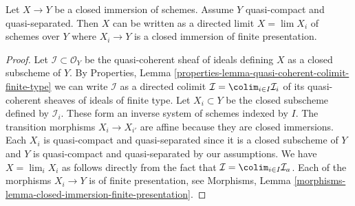\begin{lemma}
\label{lemma-closed-is-limit-closed-and-finite-presentation}
Let $X \to Y$ be a closed immersion of schemes. Assume $Y$ quasi-compact and
quasi-separated. Then $X$ can be written as a directed limit $X = \lim X_i$
of schemes over $Y$ where $X_i \to Y$ is a closed immersion
of finite presentation.
\end{lemma}

\begin{proof}
Let $\mathcal{I} \subset \mathcal{O}_Y$ be the quasi-coherent sheaf of
ideals defining $X$ as a closed subscheme of $Y$. By
Properties, Lemma \ref{properties-lemma-quasi-coherent-colimit-finite-type}
we can write $\mathcal{I}$ as a directed colimit
$\mathcal{I} = \colim_{i \in I} \mathcal{I}_i$ of its
quasi-coherent sheaves of ideals of finite type.
Let $X_i \subset Y$ be the closed subscheme defined by $\mathcal{I}_i$.
These form an inverse system of schemes indexed by $I$.
The transition morphisms $X_i \to X_{i'}$ are affine because
they are closed immersions. Each $X_i$ is quasi-compact and quasi-separated
since it is a closed subscheme of $Y$ and $Y$ is quasi-compact and
quasi-separated by our assumptions.
We have $X = \lim_i X_i$ as follows directly from the
fact that $\mathcal{I} = \colim_{i \in I} \mathcal{I}_a$.
Each of the morphisms $X_i \to Y$ is of finite presentation, see
Morphisms, Lemma \ref{morphisms-lemma-closed-immersion-finite-presentation}.
\end{proof}
